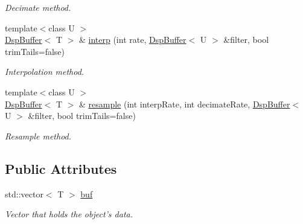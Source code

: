 \begin{DoxyCompactItemize}
\begin{DoxyCompactList}\small\item\em Decimate method. \end{DoxyCompactList}\item 
{\footnotesize template$<$class U $>$ }\\\hyperlink{class_smart_dsp_1_1_dsp_buffer}{Dsp\+Buffer}$<$ T $>$ \& \hyperlink{class_smart_dsp_1_1_dsp_buffer_a8ba9c3b00b91a42f59ad2cfaa7e9bb3e}{interp} (int rate, \hyperlink{class_smart_dsp_1_1_dsp_buffer}{Dsp\+Buffer}$<$ U $>$ \&filter, bool trim\+Tails=false)
\begin{DoxyCompactList}\small\item\em Interpolation method. \end{DoxyCompactList}\item 
{\footnotesize template$<$class U $>$ }\\\hyperlink{class_smart_dsp_1_1_dsp_buffer}{Dsp\+Buffer}$<$ T $>$ \& \hyperlink{class_smart_dsp_1_1_dsp_buffer_a034ee0be835fdbd47e6816ce83619b0d}{resample} (int interp\+Rate, int decimate\+Rate, \hyperlink{class_smart_dsp_1_1_dsp_buffer}{Dsp\+Buffer}$<$ U $>$ \&filter, bool trim\+Tails=false)
\begin{DoxyCompactList}\small\item\em Resample method. \end{DoxyCompactList}\end{DoxyCompactItemize}
\subsection*{Public Attributes}
\begin{DoxyCompactItemize}
\item 
std\+::vector$<$ T $>$ \hyperlink{class_smart_dsp_1_1_dsp_buffer_a7abb8184e08f4c9762f66bc75dcd3a6a}{buf}
\begin{DoxyCompactList}\small\item\em Vector that holds the object's data. \end{DoxyCompactList}\end{DoxyCompactItemize}
